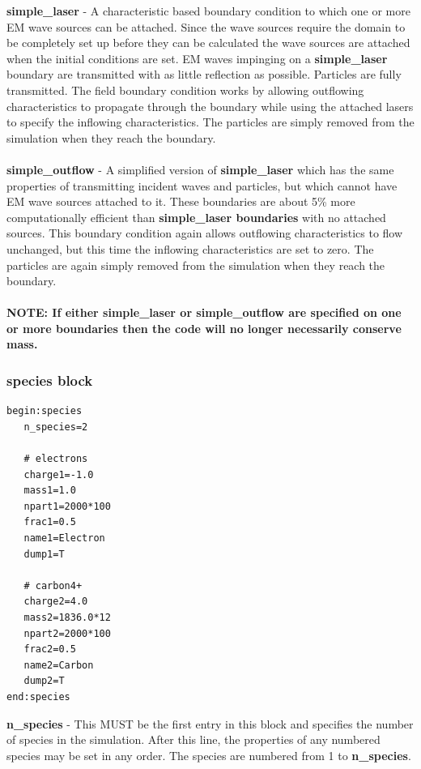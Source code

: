 \documentclass[12pt,a4paper]{article}
\newcommand{\emphtext}{\color{warwickdark} \fontfamily{phv}\selectfont\Large\bf}
\newcommand{\boxverbatim}[1]{\begin{Verbatim}[obeytabs=true,frame=single,
  framerule=0.5mm,rulecolor=\color{warwickmid},formatcom=\color{black},label=#1]}
\newcommand{\inlineemph}[1]{{\color{warwicklight} \bf{#1}}}
\begin{document}
{\emphtext simple\_laser} - A characteristic based boundary condition to which
one or more EM wave sources can be attached. Since the wave sources require the
domain to be completely set up before they can be calculated the wave sources
are attached when the initial conditions are set.  EM waves impinging on a
\inlineemph{simple\_laser} boundary are transmitted with as little reflection
as possible. Particles are fully transmitted. The field boundary condition
works by allowing outflowing characteristics to propagate through the boundary
while using the attached lasers to specify the inflowing characteristics. The
particles are simply removed from the simulation when they reach the
boundary.\\\\

{\emphtext simple\_outflow} - A simplified version of \inlineemph{simple\_laser}
which has the same properties of transmitting incident waves and
particles, but which cannot have EM wave sources attached to it. These
boundaries are about 5\% more computationally efficient than
\inlineemph{simple\_laser boundaries} with no attached sources. This boundary
condition again allows outflowing characteristics to flow unchanged, but this
time the inflowing characteristics are set to zero. The particles are again
simply removed from the simulation when they reach the boundary.\\\\

{\emphtext NOTE: If either simple\_laser or simple\_outflow are specified on
one or more boundaries then the code will no longer necessarily conserve mass.}

\subsubsection{\inlineemph{species} block}

\boxverbatim{species block}
begin:species
   n_species=2

   # electrons
   charge1=-1.0
   mass1=1.0
   npart1=2000*100
   frac1=0.5
   name1=Electron
   dump1=T

   # carbon4+
   charge2=4.0
   mass2=1836.0*12
   npart2=2000*100
   frac2=0.5
   name2=Carbon
   dump2=T
end:species
\end{Verbatim}

{\emphtext n\_species} - This MUST be the first entry in this block and
specifies the number of species in the simulation. After this line, the
properties of any numbered species may be set in any order. The species are
numbered from 1 to \inlineemph{n\_species}.\\
\end{document}
